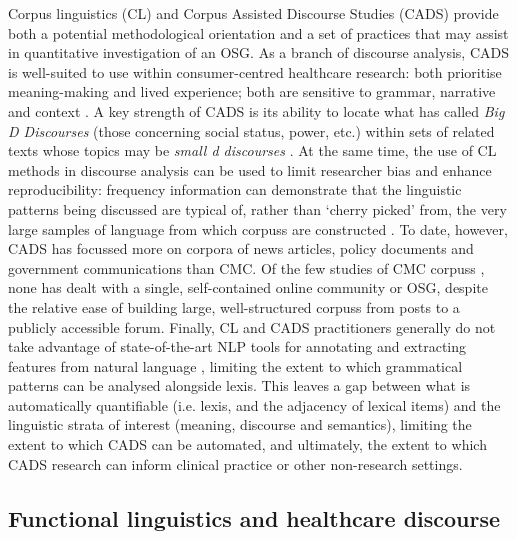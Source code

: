 \documentclass{article}
\renewcommand{\cite}{\parencite}
\begin{document}
Corpus linguistics (CL) and Corpus Assisted Discourse Studies (CADS) provide both a potential methodological orientation and a set of practices that may assist in quantitative investigation of an OSG. As a branch of discourse analysis, CADS is well-suited to use within consumer-centred healthcare research: both prioritise meaning-making and lived experience; both are sensitive to grammar, narrative and context \cite{crawford_language_2013,partington_corpora_2004}. A key strength of CADS is its ability to locate what \textcite{gee_social_2007} has called \emph{Big D Discourses} (those concerning social status, power, etc.) within sets of related texts whose topics may be \emph{small d discourses} \cite[about particular things and events in the world; see][]{baker_corpora_2013}. At the same time, the use of CL methods in discourse analysis can be used to limit researcher bias and enhance reproducibility: frequency information can demonstrate that the linguistic patterns being discussed are typical of, rather than `cherry picked' from, the very large samples of language from which corpuss are constructed \cite{baker_acceptable_2012}. To date, however, CADS has focussed more on corpora of news articles, policy documents and government communications than CMC. Of the few studies of CMC corpuss \cite[e.g.][]{harvey_am_2007,harvey_disclosures_2012,prentice_using_2010}, none has dealt with a single, self-contained online community or OSG, despite the relative ease of building large, well-structured corpuss from posts to a publicly accessible forum. Finally, CL and CADS practitioners generally do not take advantage of state-of-the-art NLP tools for annotating and extracting features from natural language \cite{groom_corpora_2015}, limiting the extent to which grammatical patterns can be analysed alongside lexis. This leaves a gap between what is automatically quantifiable (i.e. lexis, and the adjacency of lexical items) and the linguistic strata of interest (meaning, discourse and semantics), limiting the extent to which CADS can be automated, and ultimately, the extent to which CADS research can inform clinical practice or other non-research settings.

\subsection{Functional linguistics and healthcare discourse}

\end{document}
